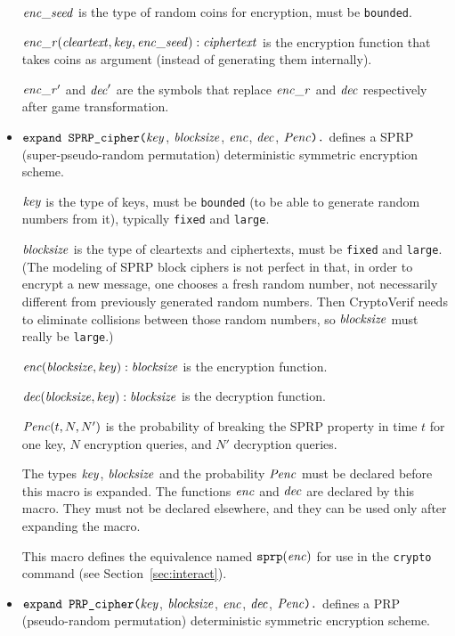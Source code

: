 \documentclass{article}
\begin{document}
\begin{itemize}
  $\mathit{enc\_seed}$ is the type of random coins for encryption, must be \texttt{bounded}.

  $\mathit{enc\_r}(\mathit{cleartext}, \mathit{key}, \mathit{enc\_seed}): \mathit{ciphertext}$ is the encryption function that takes coins as argument (instead of generating them internally).

  $\mathit{enc\_r}'$ and $\mathit{dec}'$ are the symbols that replace $\mathit{enc\_r}$ and $\mathit{dec}$ respectively after game transformation.


\item $\texttt{expand SPRP\_cipher(}\mathit{key}$,
$  \mathit{blocksize}$, $\mathit{enc}$, $\mathit{dec}$, $\mathit{Penc}\texttt{).}$
  defines a SPRP (super-pseudo-random permutation) deterministic
  symmetric encryption scheme.

   $\mathit{key}$ is the type of keys, must be \texttt{bounded} (to be able to generate random numbers from it), typically \texttt{fixed} and \texttt{large}.

   $\mathit{blocksize}$ is the type of cleartexts and ciphertexts, 
   must be \texttt{fixed} and \texttt{large}.
   (The modeling of SPRP block ciphers is not perfect in that, in
   order to encrypt a new message, one chooses a fresh random number,
   not necessarily different from previously generated random
   numbers. Then CryptoVerif needs to eliminate collisions between
   those random numbers, so $\mathit{blocksize}$ must really be
   \texttt{large}.)

   $\mathit{enc}(\mathit{blocksize}, \mathit{key}): \mathit{blocksize}$ is the encryption function.

   $\mathit{dec}(\mathit{blocksize}, \mathit{key}): \mathit{blocksize}$ is the
  decryption function.

  $\mathit{Penc}(t, N, N')$ is the probability of breaking the SPRP
  property in time $t$ for one key, $N$ encryption queries, and $N'$
  decryption queries.

  The types $\mathit{key}$, $\mathit{blocksize}$ and the
  probability $\mathit{Penc}$ must be declared before this macro is
  expanded. The functions $\mathit{enc}$ and $\mathit{dec}$ are
  declared by this macro. They must not be declared elsewhere, and
  they can be used only after expanding the macro.

   This macro defines the equivalence named $\texttt{sprp}(\mathit{enc})$
   for use in the \texttt{crypto} command 
   (see Section~\ref{sec:interact}).

\item $\texttt{expand PRP\_cipher(}\mathit{key}$,
$  \mathit{blocksize}$, $\mathit{enc}$, $\mathit{dec}$, $\mathit{Penc}\texttt{).}$
  defines a PRP (pseudo-random permutation) deterministic
  symmetric encryption scheme.


\end{itemize}
\end{document}
